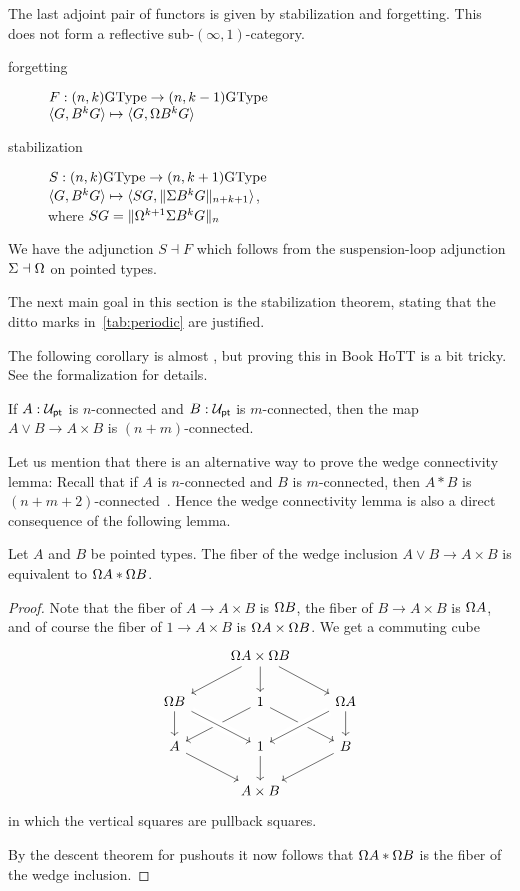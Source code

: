 The last adjoint pair of functors is given by stabilization and forgetting. This does not form a reflective sub-$(\infty,1)$-category.
\begin{description}
\item[forgetting] $F : (n,k)\GType \to (n,k-1)\GType$ \\
  $\angled{G,B^kG} \mapsto \angled{G,\loopspacesym B^kG}$
\item[stabilization] $S : (n,k)\GType \to (n,k+1)\GType$ \\
  $\angled{G,B^kG} \mapsto \angled{SG,\trunc{n+k+1}{\susp B^kG}}$,\\
  where $SG = \trunc{n}{\loopspacesym^{k+1}\susp B^kG}$
\end{description}
We have the adjunction ${S} \dashv {F}$ which follows from the suspension-loop adjunction $\Sigma\dashv\loopspacesym$ on pointed types.

The next main goal in this section is the stabilization theorem,
stating that the ditto marks in~\cref{tab:periodic} are justified.

The following corollary is almost \cite[Lemma~8.6.2]{hottbook}, but
proving this in Book HoTT is a bit tricky. See the
formalization for details.
\begin{lem}
  \label{lem:wedge-connectivity}
  If $A : \UU_\pt$ is $n$-connected and $B: \UU_\pt$ is
  $m$-connected, then the map $A \vee B \to A \times B$ is
  $(n+m)$-connected.
\end{lem}

Let us mention that there is an alternative way to prove the wedge
connectivity lemma: Recall that if $A$ is $n$-connected and $B$ is
$m$-connected, then $A \ast B$ is
$(n+m+2)$-connected~\cite[Theorem~6.8]{joinconstruction}. Hence the
wedge connectivity lemma is also a direct consequence of the following lemma.
\begin{lem}
Let $A$ and $B$ be pointed types.
The fiber of the wedge inclusion $A\vee B\to A\times B$ is equivalent to
$\loopspacesym{A}\ast\loopspacesym{B}$. 
\end{lem}
\begin{proof}
Note that the fiber of $A\to A\times B$ is $\loopspacesym B$, the fiber of $B\to A\times B$ is $\loopspacesym A$, and of course the fiber of $1\to A\times B$ is $\loopspacesym A\times \loopspacesym B$. We get a commuting cube
\begin{equation*}
\begin{tikzcd}
& \loopspacesym A\times \loopspacesym B \arrow[dl] \arrow[d] \arrow[dr] \\
\loopspacesym B \arrow[d] & 1 \arrow[dl] \arrow[dr] & \loopspacesym A \arrow[dl,crossing over] \arrow[d] \\
A \arrow[dr] & 1 \arrow[d] \arrow[from=ul,crossing over] & B \arrow[dl] \\
& A\times B
\end{tikzcd}
\end{equation*}
in which the vertical squares are pullback squares. 

By the descent theorem for pushouts it now follows that $\loopspacesym A\ast \loopspacesym B$ is the fiber of the wedge inclusion.
\end{proof}

